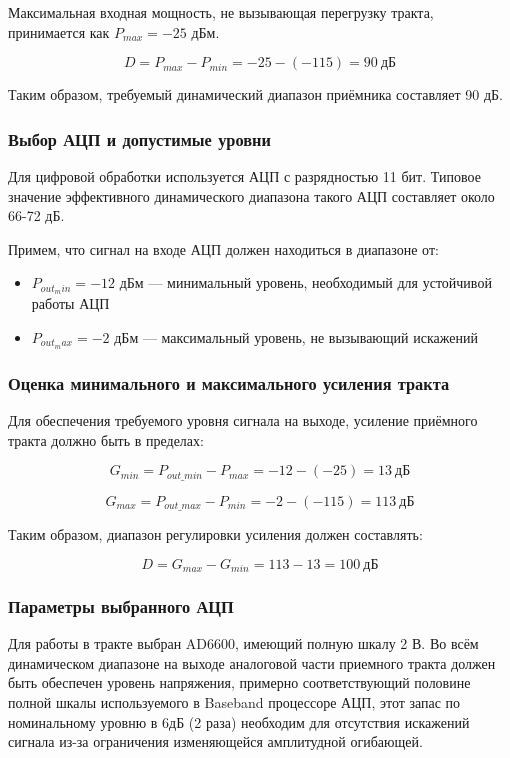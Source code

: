 \documentclass[a4paper,12pt]{article}
\begin{document}
Максимальная входная мощность, не вызывающая перегрузку тракта, принимается как $P_{max} = -25$ дБм.

\begin{equation}
D = P_{max} - P_{min} = -25 - (-115) = 90\ \text{дБ}
\end{equation}

Таким образом, требуемый динамический диапазон приёмника составляет 90 дБ.

\subsubsection{Выбор АЦП и допустимые уровни}
Для цифровой обработки используется АЦП с разрядностью 11 бит. Типовое значение эффективного динамического диапазона такого АЦП составляет около 66-72 дБ.

Примем, что сигнал на входе АЦП должен находиться в диапазоне от:
\begin{itemize}
\item $P_{out_min} = -12$ дБм — минимальный уровень, необходимый для устойчивой работы АЦП
\item $P_{out_max} = -2$ дБм — максимальный уровень, не вызывающий искажений
\end{itemize}

\subsubsection{Оценка минимального и максимального усиления тракта}

Для обеспечения требуемого уровня сигнала на выходе, усиление приёмного тракта должно быть в пределах:

\begin{equation}
G_{min} = P_{out\_min} - P_{max} = -12 - (-25) = 13\ \text{дБ}
\end{equation}

\begin{equation}
G_{max} = P_{out\_max} - P_{min} = -2 - (-115) = 113\ \text{дБ}
\end{equation}

Таким образом, диапазон регулировки усиления должен составлять:

\begin{equation}
D = G_{max} - G_{min} = 113 - 13 = 100\ \text{дБ}
\end{equation}

\subsubsection{Параметры выбранного АЦП}
Для работы в тракте выбран AD6600, имеющий полную шкалу 2 В. Во всём динамическом диапазоне на выходе аналоговой части приемного тракта должен быть обеспечен уровень напряжения, примерно соответствующий половине полной шкалы используемого в Baseband процессоре АЦП, этот запас по номинальному уровню в 6дБ (2 раза) необходим для отсутствия искажений сигнала из-за ограничения изменяющейся амплитудной огибающей.  
\end{document}
